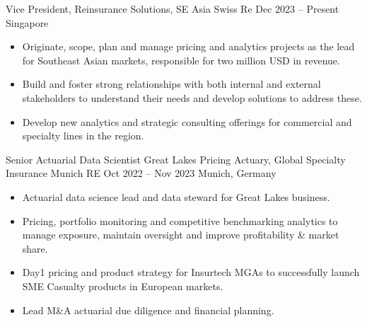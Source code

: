\documentclass[a4paper,]{fortysecondscv}
\begin{document}
\begin{cvtable}%

    \vspace{\topsep}
    \cvitemoneblock
    {Vice President, Reinsurance Solutions, SE Asia}
    {Swiss Re}
    {Dec 2023 -- Present}
    {Singapore}
    {
        \vspace{\topsep}
        \begin{itemize}[nosep, leftmargin=12pt , label={-}] %
            \item Originate, scope, plan and manage pricing and analytics projects as the lead for Southeast Asian markets, responsible for two million USD in revenue.
            \item Build and foster strong relationships with both internal and external stakeholders to understand their needs and develop solutions to address these.
            \item Develop new analytics and strategic consulting offerings for commercial and specialty lines in the region.
        \end{itemize}
    }

    \vspace{\topsep}
    \cvitemoneblockdouble
    {Senior Actuarial Data Scientist}
    {Great Lakes}
    {Pricing Actuary, Global Specialty Insurance}
    {Munich RE}
    {Oct 2022 -- Nov 2023}
    {Munich, Germany}
    {
        \begin{itemize}[nosep, leftmargin=12pt, label={-}] %
            \item Actuarial data science lead and data steward for Great Lakes business.
            \item Pricing, portfolio monitoring and competitive benchmarking analytics to manage exposure, maintain oversight and improve profitability \& market share.
            \item Day1 pricing and product strategy for Insurtech MGAs to successfully launch SME Casualty products in European markets.
            \item Lead M\&A actuarial due diligence and financial planning.
        \end{itemize}
    }


\end{cvtable}
\end{document}
